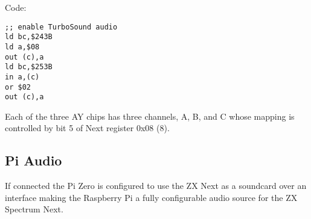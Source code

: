 \begin{multicols}{2}
\sinset
Code:
\begin{verbatim}
;; enable TurboSound audio
ld bc,$243B
ld a,$08
out (c),a
ld bc,$253B
in a,(c)
or $02
out (c),a
\end{verbatim}
\einset

Each of the three AY chips has three channels, A, B, and C whose
mapping is controlled by bit 5 of Next register 0x08 (8).
















\subsection{Pi Audio}
If connected the Pi Zero is configured to use the ZX Next as a
soundcard over an \iis interface making the Raspberry Pi a fully
configurable audio source for the ZX Spectrum Next.
\end{multicols}
